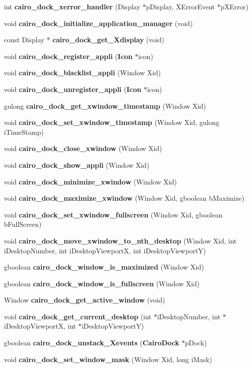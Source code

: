 \begin{CompactItemize}
\item 
int {\bf cairo\_\-dock\_\-xerror\_\-handler} (Display $\ast$p\-Display, XError\-Event $\ast$p\-XError)
\item 
void {\bf cairo\_\-dock\_\-initialize\_\-application\_\-manager} (void)
\item 
const Display $\ast$ {\bf cairo\_\-dock\_\-get\_\-Xdisplay} (void)
\item 
void {\bf cairo\_\-dock\_\-register\_\-appli} ({\bf Icon} $\ast$icon)
\item 
void {\bf cairo\_\-dock\_\-blacklist\_\-appli} (Window Xid)
\item 
void {\bf cairo\_\-dock\_\-unregister\_\-appli} ({\bf Icon} $\ast$icon)
\item 
gulong {\bf cairo\_\-dock\_\-get\_\-xwindow\_\-timestamp} (Window Xid)
\item 
void {\bf cairo\_\-dock\_\-set\_\-xwindow\_\-timestamp} (Window Xid, gulong i\-Time\-Stamp)
\item 
void {\bf cairo\_\-dock\_\-close\_\-xwindow} (Window Xid)
\item 
void {\bf cairo\_\-dock\_\-show\_\-appli} (Window Xid)
\item 
void {\bf cairo\_\-dock\_\-minimize\_\-xwindow} (Window Xid)
\item 
void {\bf cairo\_\-dock\_\-maximize\_\-xwindow} (Window Xid, gboolean b\-Maximize)
\item 
void {\bf cairo\_\-dock\_\-set\_\-xwindow\_\-fullscreen} (Window Xid, gboolean b\-Full\-Screen)
\item 
void {\bf cairo\_\-dock\_\-move\_\-xwindow\_\-to\_\-nth\_\-desktop} (Window Xid, int i\-Desktop\-Number, int i\-Desktop\-Viewport\-X, int i\-Desktop\-Viewport\-Y)
\item 
gboolean {\bf cairo\_\-dock\_\-window\_\-is\_\-maximized} (Window Xid)
\item 
gboolean {\bf cairo\_\-dock\_\-window\_\-is\_\-fullscreen} (Window Xid)
\item 
Window {\bf cairo\_\-dock\_\-get\_\-active\_\-window} (void)
\item 
void {\bf cairo\_\-dock\_\-get\_\-current\_\-desktop} (int $\ast$i\-Desktop\-Number, int $\ast$i\-Desktop\-Viewport\-X, int $\ast$i\-Desktop\-Viewport\-Y)
\item 
gboolean {\bf cairo\_\-dock\_\-unstack\_\-Xevents} ({\bf Cairo\-Dock} $\ast$p\-Dock)
\item 
void {\bf cairo\_\-dock\_\-set\_\-window\_\-mask} (Window Xid, long i\-Mask)

\end{CompactItemize}

